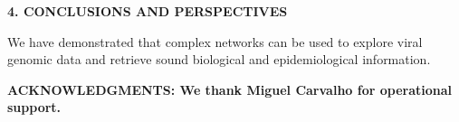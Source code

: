 \documentclass[12pt]{article}
\begin{document}
\textbf{4. CONCLUSIONS AND PERSPECTIVES}

\bigskip
\bigskip
We have demonstrated that complex networks can be used to explore viral genomic data and retrieve sound biological and epidemiological information.
\bigskip
\bigskip

{\bf ACKNOWLEDGMENTS: We thank Miguel Carvalho for operational support.}

\newpage

\end{document}
